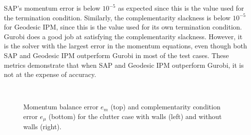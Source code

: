 SAP's momentum error is below $10^{-5}$ as expected since this is the value used
for the termination condition. Similarly, the complementarity slackness is below
$10^{-5}$ for Geodesic IPM, since this is the value used for its own termination
condition. Gurobi does a good job at satisfying the complementarity slackness.
However, it is the solver with the largest error in the momentum equations, even
though both SAP and Geodesic IPM outperform Gurobi in most of the test cases.
These metrics demonstrate that when SAP and Geodesic IPM outperform Gurobi, it
is not at the expense of accuracy.
\begin{figure}[!h]
	\centering
	\\
	\caption{\label{fig:clutter_errors_w_wall} 
	Momentum balance error $e_m$ (top) and complementarity condition error
	$e_\mu$ (bottom) for the clutter case with walls (left) and without walls
	(right).}
\end{figure}


